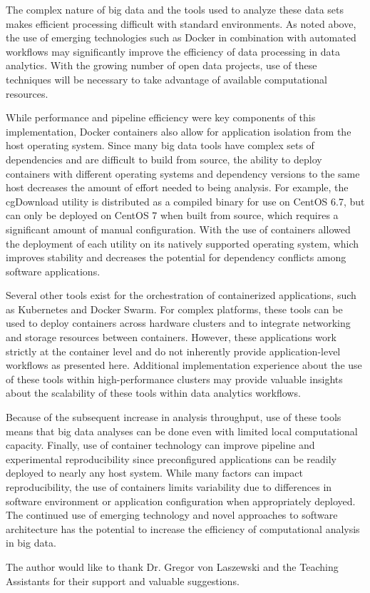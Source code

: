 \documentclass[sigconf]{acmart}
\begin{document}
	The complex nature of big data and the tools used to analyze these data sets makes efficient processing difficult with standard environments. As noted above, the use of emerging technologies such as Docker in combination with automated workflows may significantly improve the efficiency of data processing in data analytics. With the growing number of open data projects, use of these techniques will be necessary to take advantage of available computational resources.
	
	While performance and pipeline efficiency were key components of this implementation, Docker containers also allow for application isolation from the host operating system. Since many big data tools have complex sets of dependencies and are difficult to build from source, the ability to deploy containers with different operating systems and dependency versions to the same host decreases the amount of effort needed to being analysis. For example, the cgDownload utility is distributed as a compiled binary for use on CentOS 6.7, but can only be deployed on CentOS 7 when built from source, which requires a significant amount of manual configuration. With the use of containers allowed the deployment of each utility on its natively supported operating system, which improves stability and decreases the potential for dependency conflicts among software applications.
	
	Several other tools exist for the orchestration of containerized applications, such as Kubernetes and Docker Swarm. For complex platforms, these tools can be used to deploy containers across hardware clusters and to integrate networking and storage resources between containers. However, these applications work strictly at the container level and do not inherently provide application-level workflows as presented here. Additional implementation experience about the use of these tools within high-performance clusters may provide valuable insights about the scalability of these tools within data analytics workflows.
	
	Because of the subsequent increase in analysis throughput, use of these tools means that big data analyses can be done even with limited local computational capacity. Finally, use of container technology can improve pipeline and experimental reproducibility since preconfigured applications can be readily deployed to nearly any host system. While many factors can impact reproducibility, the use of containers limits variability due to differences in software environment or application configuration when appropriately deployed. The continued use of emerging technology and novel approaches to software architecture has the potential to increase the efficiency of computational analysis in big data.

\begin{acks}		
	
	The author would like to thank Dr. Gregor von Laszewski and the Teaching Assistants for their support and valuable suggestions.
	
\end{acks}


 
\end{document}
